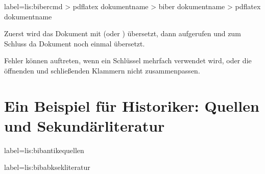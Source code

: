 \begin{lfgwcode}{label={lis:bibercmd}}
> pdflatex dokumentname
> biber dokumentname
> pdflatex dokumentname
\end{lfgwcode}

Zuerst wird das Dokument mit  (oder ) übersetzt,
dann  aufgerufen und zum Schluss da Dokument noch einmal übersetzt.

Fehler können auftreten, wenn ein Schlüssel mehrfach verwendet wird, 
oder die öffnenden und schließenden Klammern nicht zusammenpassen.

\section{Ein Beispiel für Historiker: Quellen und Sekundärliteratur}\label{sec:bibliografie}




\begin{lfgwcode}{label={lis:bibantikequellen}}
\printbibliography[%
  heading=subbibliography,
  keyword=ancient,%
  title={Antike Quellen}]
\end{lfgwcode}

\begin{lfgwcode}{label={lis:bibabksekliteratur}}
\printbibliography[%
  heading=subbibliography,
  keyword=corpus,%
  title={Abkürzungen und Sigel}]

\printbibliography[%
  heading=subbibliography,
  notkeyword=ancient,%
  notkeyword=corpus,%
  title={Sekundärliteratur}]
\end{lfgwcode}

